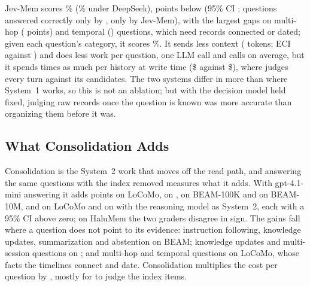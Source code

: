 Jev-Mem scores \jmAcc\% (\jmAccDS\% under DeepSeek), \jmDiff{} points below \sys{} (95\% CI \jmCI; \jmUp{} questions answered correctly only by \sys, \jmDown{} only by Jev-Mem), with the largest gaps on multi-hop (\jmMultiHop{} points) and temporal (\jmTemporal) questions, which need records connected or dated; given each question's category, it scores \jmLabels\%.
It sends less context (\jmCtx{} tokens; ECI \jmEci{} against \finEciLoCoMo) and does less work per question, one LLM call and \jmJevCalls{} \jev{} calls on average, but it spends \jmWriteRatio{} times as much per history at write time (\$\jmWrite{} against \$\writeLoCoMo), where \jev{} judges every turn against its candidates.
The two systems differ in more than where System~1 works, so this is not an ablation; but with the decision model held fixed, judging raw records once the question is known was more accurate than organizing them before it was.

\subsection{What Consolidation Adds}
\label{sec:consolidation}

Consolidation is the System~2 work that \sys{} moves off the read path, and answering the same questions with the index removed measures what it adds.
With gpt-4.1-mini answering it adds \consLoCoMoAbs{} points on LoCoMo, \consLMEAbs{} on \lme, \consBeamAbs{} on BEAM-100K and \consBeamTenAbs{} on BEAM-10M, and \dsConsLoCoMoAbs{} on LoCoMo and \dsConsLMEAbs{} on \lme{} with the reasoning model as System~2, each with a 95\% CI above zero; on HaluMem the two graders disagree in sign.
The gains fall where a question does not point to its evidence: instruction following, knowledge updates, summarization and abstention on BEAM; knowledge updates and multi-session questions on \lme; and multi-hop and temporal questions on LoCoMo, whose facts the timelines connect and date.
Consolidation multiplies the cost per question by \consCostRange, mostly for \jev{} to judge the index items.
